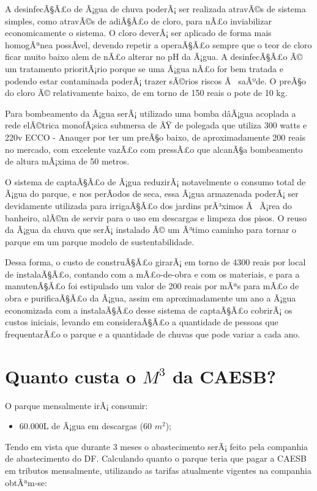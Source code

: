 A desinfecÃ§Ã£o de Ã¡gua de chuva poderÃ¡ ser realizada atravÃ©s de sistema simples, como atravÃ©s de adiÃ§Ã£o de cloro, para nÃ£o inviabilizar economicamente o sistema. O cloro deverÃ¡ ser aplicado de forma mais homogÃªnea possÃ­vel, devendo repetir a operaÃ§Ã£o sempre que o teor de cloro ficar muito baixo alem de nÃ£o alterar no pH da Ã¡gua. A desinfecÃ§Ã£o Ã© um tratamento prioritÃ¡rio porque se uma Ã¡gua nÃ£o for bem tratada e podendo estar contaminada poderÃ¡ trazer sÃ©rios riscos Ã  saÃºde. O preÃ§o do cloro Ã© relativamente baixo, de em torno de 150 reais o pote de 10 kg.

Para bombeamento da Ã¡gua serÃ¡ utilizado uma bomba dâÃ¡gua acoplada a rede elÃ©trica monofÃ¡sica submersa de ÂŸ de polegada que utiliza 300 watts e 220v ECCO - Anauger por ter um preÃ§o baixo, de aproximadamente 200 reais no mercado, com excelente vazÃ£o com pressÃ£o que alcanÃ§a bombeamento de altura mÃ¡xima de 50 metros.

O sistema de captaÃ§Ã£o de Ã¡gua reduzirÃ¡ notavelmente o consumo total de Ã¡gua do parque, e nos perÃ­odos de seca, essa Ã¡gua armazenada poderÃ¡ ser devidamente utilizada para irrigaÃ§Ã£o dos jardins prÃ³ximos Ã  Ã¡rea do banheiro, alÃ©m de servir para o uso em descargas e limpeza dos pisos. O reuso da Ã¡gua da chuva que serÃ¡ instalado Ã© um Ã³timo caminho para tornar o parque em um parque modelo de sustentabilidade.

Dessa forma, o custo de construÃ§Ã£o girarÃ¡ em torno de 4300 reais por local de instalaÃ§Ã£o, contando com a mÃ£o-de-obra e com os materiais, e para a manutenÃ§Ã£o foi estipulado um valor de 200 reais por mÃªs para mÃ£o de obra e purificaÃ§Ã£o da Ã¡gua, assim em aproximadamente um ano a Ã¡gua economizada com a instalaÃ§Ã£o desse sistema de captaÃ§Ã£o cobrirÃ¡ os custos iniciais, levando em consideraÃ§Ã£o a quantidade de pessoas que frequentarÃ£o o parque e a quantidade de chuvas que pode variar a cada ano.

\section{Quanto custa o $M^{3}$ da CAESB?}

O parque mensalmente irÃ¡ consumir:
\begin{itemize}
	\item 60.000L de Ã¡gua em descargas (60 $m^{2}$);
\end{itemize}

	
	Tendo em vista que durante 3 meses o abastecimento serÃ¡ feito pela companhia de abastecimento do DF. Calculando quanto o parque teria que pagar a CAESB em tributos mensalmente, utilizando as tarifas atualmente vigentes na companhia obtÃªm-se: 
	

